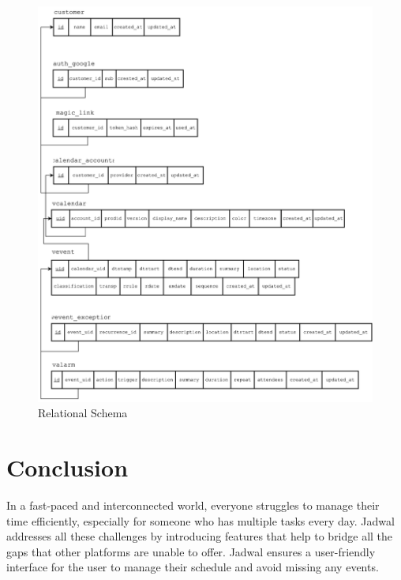 \documentclass[12pt,a4paper,twoside]{report}
\begin{document}
\begin{figure}[!h]
    \centering
    \includegraphics[width=\textwidth]{images/database-schema.png}
    \caption{Relational Schema}
    \label{fig:relational-schema}
\end{figure}





\chapter*{Conclusion}

In a fast-paced and interconnected world, everyone struggles to manage their time efficiently, especially for someone who has multiple tasks every day. Jadwal addresses all these challenges by introducing features that help to bridge all the gaps that other platforms are unable to offer. Jadwal ensures a user-friendly interface for the user to manage their schedule and avoid missing any events.
\end{document}
